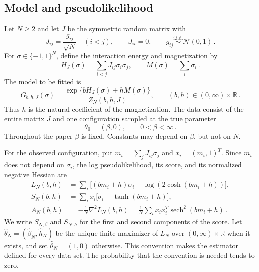 \documentclass[11pt]{amsart}
\numberwithin{equation}{section}
\theoremstyle{remark}
\newcommand{\R}{\mathbb R}
\newcommand{\sech}{\operatorname{sech}}
\newcommand{\Normal}{\mathcal N}
\begin{document}
\subsection{Model and pseudolikelihood}
Let $N\ge2$ and let $J$ be the symmetric random matrix with
\begin{equation}
 J_{ij}=\frac{g_{ij}}{\sqrt N}\quad(i<j),\qquad
 J_{ii}=0,\qquad g_{ij}\stackrel{\mathrm{i.i.d.}}{\sim}\Normal(0,1)\,.
 \label{eq:disorder}
\end{equation}
For $\sigma\in\{-1,1\}^N$, define the interaction energy and magnetization by
\begin{equation}
 H_J(\sigma)=\sum_{i<j}J_{ij}\sigma_i\sigma_j,
 \qquad M(\sigma)=\sum_i\sigma_i\,.
 \label{eq:energy}
\end{equation}
The model to be fitted is
\begin{equation}
 G_{b,h,J}(\sigma)=\frac{\exp\{bH_J(\sigma)+hM(\sigma)\}}{Z_N(b,h,J)},
 \qquad (b,h)\in(0,\infty)\times\R\,.
 \label{eq:gibbs}
\end{equation}
Thus $h$ is the natural coefficient of the magnetization. The data consist of the entire matrix $J$ and one configuration sampled at the true parameter
\begin{equation}
 \theta_0=(\beta,0),\qquad 0<\beta<\infty\,.
 \label{eq:true-parameter}
\end{equation}
Throughout the paper $\beta$ is fixed. Constants may depend on $\beta$, but not on $N$.

For the observed configuration, put $m_i=\sum_jJ_{ij}\sigma_j$ and $x_i=(m_i,1)^T$. Since $m_i$ does not depend on $\sigma_i$, the log pseudolikelihood, its score, and its normalized negative Hessian are
\begin{align}
 L_N(b,h)
 &=\sum_i\bigl[(bm_i+h)\sigma_i-\log(2\cosh(bm_i+h))\bigr],
 \label{eq:pseudolikelihood}\\
 S_N(b,h)
 &=\sum_i x_i\bigl[\sigma_i-\tanh(bm_i+h)\bigr],
 \label{eq:score}\\
 A_N(b,h)
 &=-\frac1N\nabla^2 L_N(b,h)
 =\frac1N\sum_i x_ix_i^T\sech^2(bm_i+h)\,.
 \label{eq:curvature}
\end{align}
We write $S_{N,\beta}$ and $S_{N,h}$ for the first and second components of the score. Let $\widehat\theta_N=(\widehat\beta_N,\widehat h_N)$ be the unique finite maximizer of $L_N$ over $(0,\infty)\times\R$ when it exists, and set $\widehat\theta_N=(1,0)$ otherwise. This convention makes the estimator defined for every data set. The probability that the convention is needed tends to zero.
\end{document}
